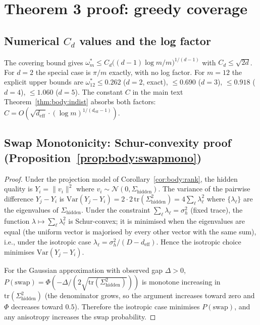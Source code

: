 \documentclass{article}
\begin{document}
\section{Theorem 3 proof: greedy coverage}
\label{app:proof3}


\subsection*{Numerical $C_d$ values and the log factor}

The covering bound \citep{rogers1963covering} gives
$\omega_m^* \le C_d \big((d-1)\log m / m\big)^{1/(d-1)}$ with
$C_d \le \sqrt{2d}$. For $d = 2$ the special case is $\pi/m$ exactly,
with no log factor. For $m = 12$ the explicit upper bounds are
$\omega^*_{12} \le 0.262$ ($d=2$, exact), $\le 0.690$ ($d=3$),
$\le 0.918$ ($d=4$), $\le 1.060$ ($d=5$). The constant $C$ in the
main text Theorem~\ref{thm:body:indist} absorbs both factors:
$C = O(\sqrt{d_{\mathrm{eff}}} \cdot (\log m)^{1/(d_{\mathrm{eff}}-1)})$.

\subsection*{Swap Monotonicity: Schur-convexity proof (Proposition~\ref{prop:body:swapmono})}

\begin{proof}
Under the projection model of Corollary~\ref{cor:body:rank}, the
hidden quality is $Y_i = \|v_i\|^2$ where $v_i \sim
\mathcal{N}(0, \Sigma_{\mathrm{hidden}})$. The variance of the
pairwise difference $Y_j - Y_i$ is $\mathrm{Var}(Y_j - Y_i) = 2 \cdot
2\,\mathrm{tr}(\Sigma_{\mathrm{hidden}}^2) = 4 \sum_{\ell} \lambda_\ell^2$
where $\{\lambda_\ell\}$ are the eigenvalues of
$\Sigma_{\mathrm{hidden}}$. Under the constraint $\sum_\ell
\lambda_\ell = \sigma_h^2$ (fixed trace), the function $\lambda \mapsto
\sum_\ell \lambda_\ell^2$ is Schur-convex; it is minimised when the
eigenvalues are equal (the uniform vector is majorised by every
other vector with the same sum), i.e., under the isotropic case
$\lambda_\ell = \sigma_h^2 / (D - d_{\mathrm{eff}})$. Hence the
isotropic choice minimises $\mathrm{Var}(Y_j - Y_i)$.

For the Gaussian approximation with observed gap $\Delta > 0$,
$P(\text{swap}) = \Phi(-\Delta / (2\sqrt{\mathrm{tr}(\Sigma_{\mathrm{hidden}}^2)}))$
is monotone increasing in $\mathrm{tr}(\Sigma_{\mathrm{hidden}}^2)$
(the denominator grows, so the argument increases toward zero and
$\Phi$ decreases toward $0.5$). Therefore the isotropic case
minimises $P(\text{swap})$, and any anisotropy increases the swap
probability.
\end{proof}
\end{document}
